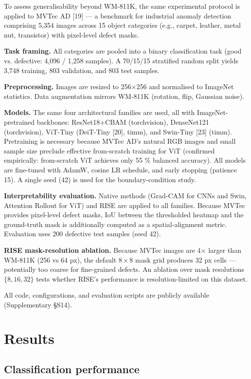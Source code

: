 \documentclass[11pt,a4paper]{article}
\begin{document}
To assess generalisability beyond WM-811K, the same experimental protocol is applied to MVTec AD [19] --- a benchmark for industrial anomaly detection comprising 5,354 images across 15 object categories (e.g., carpet, leather, metal nut, transistor) with pixel-level defect masks.

\textbf{Task framing.} All categories are pooled into a binary classification task (good vs. defective: 4,096 / 1,258 samples). A 70/15/15 stratified random split yields 3,748 training, 803 validation, and 803 test samples.

\textbf{Preprocessing.} Images are resized to 256$\times$256 and normalised to ImageNet statistics. Data augmentation mirrors WM-811K (rotation, flip, Gaussian noise).

\textbf{Models.} The same four architectural families are used, all with ImageNet-pretrained backbones: ResNet18+CBAM (torchvision), DenseNet121 (torchvision), ViT-Tiny (DeiT-Tiny [20], timm), and Swin-Tiny [23] (timm). Pretraining is necessary because MVTec AD's natural RGB images and small sample size preclude effective from-scratch training for ViT (confirmed empirically: from-scratch ViT achieves only 55 \% balanced accuracy). All models are fine-tuned with AdamW, cosine LR schedule, and early stopping (patience 15). A single seed (42) is used for the boundary-condition study.

\textbf{Interpretability evaluation.} Native methods (Grad-CAM for CNNs and Swin, Attention Rollout for ViT) and RISE are applied to all families. Because MVTec provides pixel-level defect masks, IoU between the thresholded heatmap and the ground-truth mask is additionally computed as a spatial-alignment metric. Evaluation uses 200 defective test samples (seed 42).

\textbf{RISE mask-resolution ablation.} Because MVTec images are 4$\times$ larger than WM-811K (256 vs 64 px), the default $8{\times}8$ mask grid produces 32 px cells --- potentially too coarse for fine-grained defects. An ablation over mask resolutions $\{8, 16, 32\}$ tests whether RISE's performance is resolution-limited on this dataset.

All code, configurations, and evaluation scripts are publicly available (Supplementary \S{}S14).


\section{Results}

\subsection{Classification performance}
\end{document}
